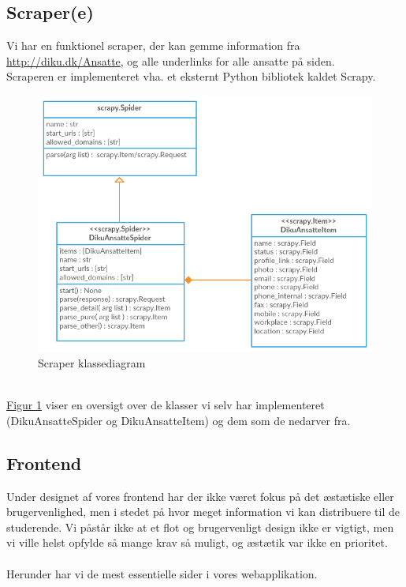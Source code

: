 \documentclass[12pt]{article}
\begin{document}
\subsection{Scraper(e)}
Vi har en funktionel scraper, der kan gemme information fra \url{http://diku.dk/Ansatte}, og alle underlinks for alle ansatte på siden.\\
Scraperen er implementeret vha. et eksternt Python bibliotek kaldet Scrapy.

\begin{figure}[H]
    \centering
    \includegraphics[scale=0.5]{scraper_class_diagram.png}
    \caption{Scraper klassediagram}
    \label{fig:scraper_class_diagram}
\end{figure}~\\
\hyperref[fig:scraper_class_diagram]{Figur \ref*{fig:scraper_class_diagram}} viser en oversigt over de klasser vi selv har implementeret (DikuAnsatteSpider og DikuAnsatteItem) og dem som de nedarver fra.\\

\subsection{Frontend}
Under designet af vores frontend har der ikke været fokus på det æstætiske eller brugervenlighed, men i stedet på hvor meget information vi kan distribuere til de studerende. Vi påstår ikke at et flot og brugervenligt design ikke er vigtigt, men vi ville helst opfylde så mange krav så muligt, og æstætik var ikke en prioritet.\\
\\
Herunder har vi de mest essentielle sider i vores webapplikation.
\end{document}
